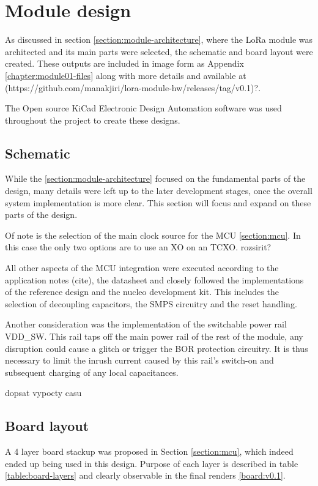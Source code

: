 
\section{Module design}
As discussed in section \ref{section:module-architecture}, where the LoRa module was architected and its main parts were selected, the schematic and board layout were created. These outputs are included in image form as Appendix \ref{chapter:module01-files} along with more details and available at (https://github.com/manakjiri/lora-module-hw/releases/tag/v0.1)?.

The Open source KiCad Electronic Design Automation software was used throughout the project to create these designs. 

\subsection{Schematic}
While the \ref{section:module-architecture} focused on the fundamental parts of the design, many details were left up to the later development stages, once the overall system implementation is more clear. This section will focus and expand on these parts of the design.

Of note is the selection of the main clock source for the MCU \ref{section:mcu}. In this case the only two options are to use an XO on an TCXO. rozsirit?

All other aspects of the MCU integration were executed according to the application notes (cite), the datasheet and closely followed the implementations of the reference design and the nucleo development kit. This includes the selection of decoupling capacitors, the SMPS circuitry and the reset handling.

Another consideration was the implementation of the switchable power rail VDD\_SW. This rail taps off the main power rail of the rest of the module, any disruption could cause a glitch or trigger the BOR protection circuitry. It is thus necessary to limit the inrush current caused by this rail's switch-on and subsequent charging of any local capacitances.

dopsat vypocty casu

\subsection{Board layout}
A 4 layer board stackup was proposed in Section \ref{section:mcu}, which indeed ended up being used in this design. Purpose of each layer is described in table \ref{table:board-layers} and clearly observable in the final renders \ref{board:v0.1}.

